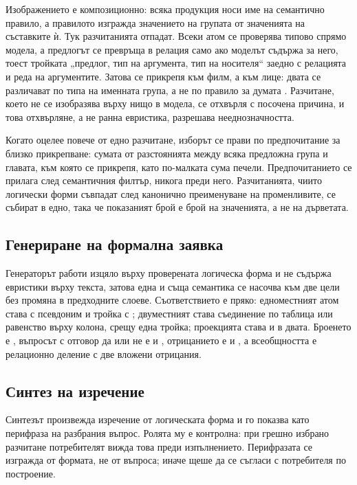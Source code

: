 Изображението е композиционно: всяка продукция носи име на семантично правило, а правилото
изгражда значението на групата от значенията на съставките ѝ. Тук разчитанията отпадат.
Всеки атом се проверява типово спрямо модела, а предлогът се превръща в релация само ако
моделът съдържа  за него, тоест тройката „предлог, тип на аргумента, тип на
носителя“ заедно с релацията и реда на аргументите. Затова  се прикрепя към
филм, а  към лице: двата се различават по типа на именната група, а не
по правило за думата . Разчитане, което не се изобразява върху нищо в модела, се
отхвърля с посочена причина, и това отхвърляне, а не ранна евристика, разрешава
нееднозначността.

Когато оцелее повече от едно разчитане, изборът се прави по предпочитание за близко
прикрепване: сумата от разстоянията между всяка предложна група и главата, към която се
прикрепя, като по-малката сума печели. Предпочитанието се прилага след семантичния филтър,
никога преди него. Разчитанията, чиито логически форми съвпадат след канонично
преименуване на променливите, се събират в едно, така че показаният брой е брой на
значенията, а не на дърветата.

\subsection{Генериране на формална заявка}

Генераторът работи изцяло върху проверената логическа форма и не съдържа евристики върху
текста, затова една и съща семантика се насочва към две цели без промяна в предходните
слоеве. Съответствието е пряко: едноместният атом става  с псевдоним и тройка с
; двуместният става съединение по таблица или равенство върху колона, срещу една
тройка; проекцията става  и в двата. Броенето е
, въпросът с отговор да или не е  и ,
отрицанието е  и , а всеобщността е релационно
деление с две вложени отрицания.

\subsection{Синтез на изречение}
\label{sub:synth}

Синтезът произвежда изречение от логическата форма и го показва като перифраза на разбрания
въпрос. Ролята му е контролна: при грешно избрано разчитане потребителят вижда това преди
изпълнението. Перифразата се изгражда от формата, не от въпроса; иначе щеше да се съгласи с
потребителя по построение.
